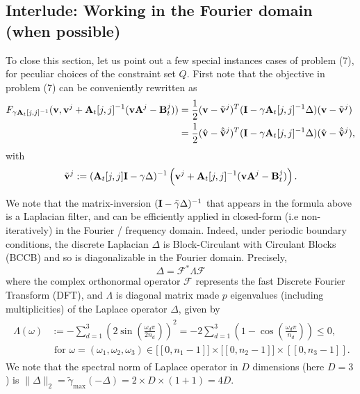 \subsection{Interlude: Working in the Fourier domain (when possible)}
To close this section, let us point out a few special instances cases of problem (7), for peculiar choices of the constraint set $Q$. First note that the objective in problem (7) can be conveniently rewritten
as
\begin{equation}
  \begin{split}
    F_{\gamma\mathbf{A}_t[j,j]^{-1}}(\mathbf{v}, \mathbf{v}^j + \mathbf{A}_t[j,j]^{-1}(\mathbf{v}\mathbf{A}^j - \mathbf{B}_t^j)) &= \frac{1}{2}(\mathbf{v}-\tilde{\mathbf{v}}^j)^T(\mathbf{I} - \gamma\mathbf{A}_t[j,j]^{-1}\Delta)(\mathbf{v}-\tilde{\mathbf{v}}^j)
    \\
    &=\frac{1}{2}(\hat{\mathbf{v}}-\hat{\tilde{\mathbf{v}}}^j)^T(\mathbf{I} - \gamma\mathbf{A}_t[j,j]^{-1}\Delta)(\hat{\mathbf{v}}
    -\hat{\tilde{\mathbf{v}}}^j),
  \end{split}
\end{equation}
with
\begin{equation}
  \tilde{\mathbf{v}}^j := (\mathbf{A}_t[j,j]\mathbf{I} -
  \gamma\Delta)^{-1}\left(\mathbf{v}^j + \mathbf{A}_t[j,j]^{-1}(\mathbf{v}\mathbf{A}^j - \mathbf{B}_t^j)\right).
\end{equation}

We note that the matrix-inversion $(\mathbf{I} - \tilde{\gamma}\Delta)^{-1}$ that appears in the formula above is a Laplacian filter, and can
be efficiently applied in closed-form (i.e non-iteratively) in the Fourier / frequency domain. Indeed, under periodic
boundary conditions, the discrete Laplacian $\Delta$ is
Block-Circulant with Circulant Blocks (BCCB) and so is diagonalizable
in the Fourier domain. Precisely,
\begin{equation}
  \Delta = \mathcal F^*\Lambda \mathcal F
\end{equation}
where the complex orthonormal operator $\mathcal F$ represents the fast Discrete Fourier Transform (DFT), and $\Lambda$ is diagonal matrix made $p$ eigenvalues (including multiplicities) of the Laplace operator $\Delta$, given by
\begin{eqnarray*}
\begin{split}
\Lambda(\omega) &:=
-\sum_{d=1}^3\left(2\sin\left(\frac{\omega_d\pi}{2n_d}\right)\right)^2
= -2\sum_{d=1}^3\left(1-\cos\left(\frac{\omega_d\pi}{n_d}\right)
\right) \le 0,
\\
&\text{ for }\omega = (\omega_1, \omega_2, \omega_3) \in \mathbb
[\![0,n_1-1]\!] \times \mathbb [\![0,n_2-1]\!] \times [\![0,n_3-1]\!].
\end{split}
\label{eq:eigf}
\end{eqnarray*}
We note that the spectral norm of Laplace
operator in $D$ dimensions (here $D=3$) is
$\|\Delta\|_2 = \tilde{\gamma}_{\max}(-\Delta) = 2 \times D \times (1 + 1) = 4D$.

